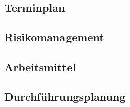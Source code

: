 \subsection{Terminplan}


\subsection{Risikomanagement}

\subsection{Arbeitsmittel}

\subsection{Durchführungsplanung}